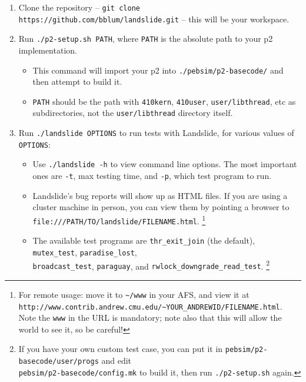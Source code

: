 \documentclass{article}
\begin{document}
\begin{enumerate}
	\item Clone the repository -- {\tt git clone https://github.com/bblum/landslide.git} -- this will be your workspace.
	\item Run {\tt ./p2-setup.sh PATH}, where {\tt PATH} is the absolute path to your p2 implementation.
		\begin{itemize}
			\item This command will import your p2 into {\tt ./pebsim/p2-basecode/} and then attempt to build it.
			\item {\tt PATH} should be the path with {\tt 410kern}, {\tt 410user}, {\tt user/libthread}, etc as subdirectories, not the {\tt user/libthread} directory itself.
		\end{itemize}
	\item Run {\tt ./landslide OPTIONS} to run tests with Landslide, for various values of {\tt OPTIONS}:
		\begin{itemize}
			\item Use {\tt ./landslide -h} to view command line options. The most important ones are {\tt -t}, max testing time, and {\tt -p}, which test program to run.
			\item Landslide's bug reports will show up as HTML files. If you are using a cluster machine in person, you can view them by pointing a browser to {\tt file:///PATH/TO/landslide/FILENAME.html}.
				\footnote{For remote usage: move it to {\tt \textasciitilde/www} in your AFS, and view it at {\tt http://www.contrib.andrew.cmu.edu/\textasciitilde{}YOUR\_ANDREWID/FILENAME.html}. Note the {\tt www} in the URL is mandatory; note also that this will allow the world to see it, so be careful!}
			\item The available test programs are {\tt thr\_exit\_join} (the default), {\tt mutex\_test}, {\tt paradise\_lost}, \\ {\tt broadcast\_test}, {\tt paraguay}, and {\tt rwlock\_downgrade\_read\_test}.
				\footnote{If you have your own custom test case, you can put it in {\tt pebsim/p2-basecode/user/progs} and edit \\ {\tt pebsim/p2-basecode/config.mk} to build it, then run {\tt ./p2-setup.sh} again.}

\end{itemize}
\end{enumerate}
\end{document}
